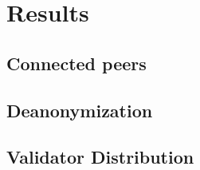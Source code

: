 \section{Results}\label{sec:results}
\subsection{Connected peers}\label{subsec:connected-peers}
\subsection{Deanonymization}\label{subsec:deanonymization}
\subsection{Validator Distribution}\label{subsec:validator-distribution}